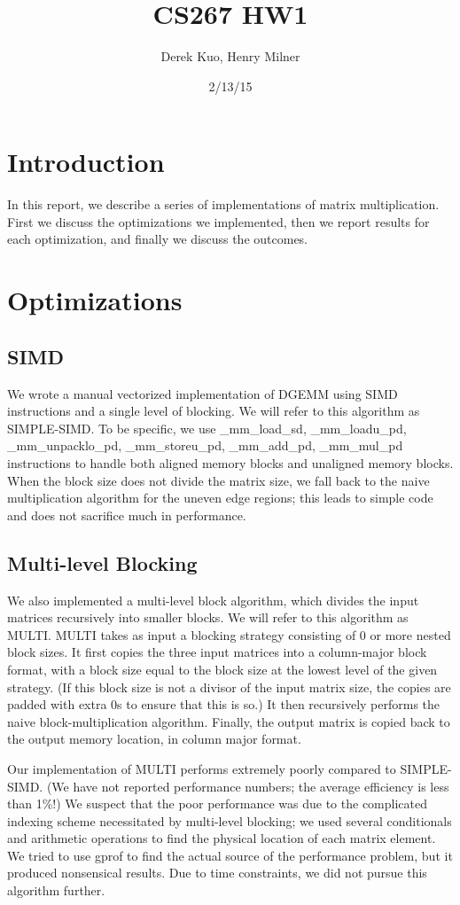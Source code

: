 \documentclass{article}
\author{Derek Kuo, Henry Milner}
\title{CS267 HW1}
\date{2/13/15}
\begin{document}
\maketitle

\section{Introduction}
In this report, we describe a series of implementations of matrix multiplication.  First we discuss the optimizations we implemented, then we report results for each optimization, and finally we discuss the outcomes.

\section{Optimizations}
\subsection{SIMD}
We wrote a manual vectorized implementation of DGEMM using SIMD instructions and a single level of blocking. We will refer to this algorithm as SIMPLE-SIMD. To be specific, we use \_mm\_load\_sd, \_mm\_loadu\_pd, \_mm\_unpacklo\_pd, \_mm\_storeu\_pd, \_mm\_add\_pd, \_mm\_mul\_pd instructions to handle both aligned memory blocks and unaligned memory blocks.  When the block size does not divide the matrix size, we fall back to the naive multiplication algorithm for the uneven edge regions; this leads to simple code and does not sacrifice much in performance.

\subsection{Multi-level Blocking}
We also implemented a multi-level block algorithm, which divides the input matrices recursively into smaller blocks.  We will refer to this algorithm as MULTI.  MULTI takes as input a blocking strategy consisting of 0 or more nested block sizes.  It first copies the three input matrices into a column-major block format, with a block size equal to the block size at the lowest level of the given strategy.  (If this block size is not a divisor of the input matrix size, the copies are padded with extra 0s to ensure that this is so.)  It then recursively performs the naive block-multiplication algorithm.  Finally, the output matrix is copied back to the output memory location, in column major format.

Our implementation of MULTI performs extremely poorly compared to SIMPLE-SIMD.  (We have not reported performance numbers; the average efficiency is less than 1\%!)  We suspect that the poor performance was due to the complicated indexing scheme necessitated by multi-level blocking; we used several conditionals and arithmetic operations to find the physical location of each matrix element.  We tried to use gprof to find the actual source of the performance problem, but it produced nonsensical results.  Due to time constraints, we did not pursue this algorithm further.
\end{document}
